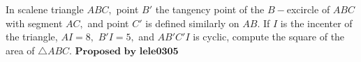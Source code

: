 In scalene triangle $ABC,$ point $B'$ the tangency point of the $B-$excircle of $ABC$ with segment $AC,$ and point $C'$ is defined similarly on $AB.$ If $I$ is the incenter of the triangle, $AI=8,$ $B'I=5,$ and $AB'C'I$ is cyclic, compute the square of the area of $\triangle ABC.$ $\textbf{Proposed by lele0305}$
